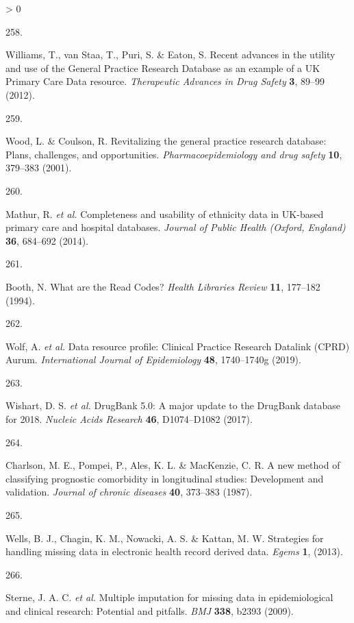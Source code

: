 \documentclass[a4paper, twoside]{templates/ociamthesis}
\newlength{\cslhangindent}
\newlength{\csllabelwidth}
\newenvironment{CSLReferences}[3] %
 {%
  \setlength{\parindent}{0pt}
  \ifodd #1 \everypar{\setlength{\hangindent}{\cslhangindent}}\ignorespaces\fi
  \ifnum #2 > 0
  \setlength{\parskip}{#2\baselineskip}
  \fi
 }%
 {}
\newcommand{\CSLLeftMargin}[1]{\parbox[t]{\maxof{\widthof{#1}}{\csllabelwidth}}{#1}}
\newcommand{\CSLRightInline}[1]{\parbox[t]{\linewidth - \csllabelwidth}{#1}}
\begin{document}
\begin{CSLReferences}{0}{0}
\leavevmode\hypertarget{ref-williams2012}{}%
\CSLLeftMargin{258. }
\CSLRightInline{Williams, T., van Staa, T., Puri, S. \& Eaton, S. Recent advances in the utility and use of the {General Practice Research Database} as an example of a {UK Primary Care Data} resource. \emph{Therapeutic Advances in Drug Safety} \textbf{3}, 89--99 (2012).}

\leavevmode\hypertarget{ref-wood2001revitalizing}{}%
\CSLLeftMargin{259. }
\CSLRightInline{Wood, L. \& Coulson, R. Revitalizing the general practice research database: Plans, challenges, and opportunities. \emph{Pharmacoepidemiology and drug safety} \textbf{10}, 379--383 (2001).}

\leavevmode\hypertarget{ref-mathur2014}{}%
\CSLLeftMargin{260. }
\CSLRightInline{Mathur, R. \emph{et al.} Completeness and usability of ethnicity data in {UK}-based primary care and hospital databases. \emph{Journal of Public Health (Oxford, England)} \textbf{36}, 684--692 (2014).}

\leavevmode\hypertarget{ref-booth1994}{}%
\CSLLeftMargin{261. }
\CSLRightInline{Booth, N. What are the {Read Codes}? \emph{Health Libraries Review} \textbf{11}, 177--182 (1994).}

\leavevmode\hypertarget{ref-wolf2019}{}%
\CSLLeftMargin{262. }
\CSLRightInline{Wolf, A. \emph{et al.} Data resource profile: {Clinical Practice Research Datalink} ({CPRD}) {Aurum}. \emph{International Journal of Epidemiology} \textbf{48}, 1740--1740g (2019).}

\leavevmode\hypertarget{ref-wishart2017}{}%
\CSLLeftMargin{263. }
\CSLRightInline{Wishart, D. S. \emph{et al.} {DrugBank} 5.0: A major update to the {DrugBank} database for 2018. \emph{Nucleic Acids Research} \textbf{46}, D1074--D1082 (2017).}

\leavevmode\hypertarget{ref-charlson1987new}{}%
\CSLLeftMargin{264. }
\CSLRightInline{Charlson, M. E., Pompei, P., Ales, K. L. \& MacKenzie, C. R. A new method of classifying prognostic comorbidity in longitudinal studies: Development and validation. \emph{Journal of chronic diseases} \textbf{40}, 373--383 (1987).}

\leavevmode\hypertarget{ref-wells2013strategies}{}%
\CSLLeftMargin{265. }
\CSLRightInline{Wells, B. J., Chagin, K. M., Nowacki, A. S. \& Kattan, M. W. Strategies for handling missing data in electronic health record derived data. \emph{Egems} \textbf{1}, (2013).}

\leavevmode\hypertarget{ref-sterne2009}{}%
\CSLLeftMargin{266. }
\CSLRightInline{Sterne, J. A. C. \emph{et al.} Multiple imputation for missing data in epidemiological and clinical research: Potential and pitfalls. \emph{BMJ} \textbf{338}, b2393 (2009).}


\end{CSLReferences}
\end{document}
